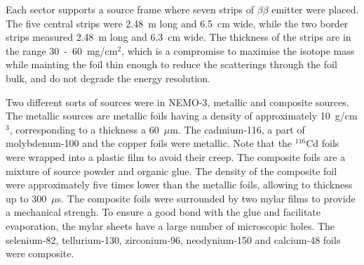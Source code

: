 \documentclass[main.tex]{subfiles}
\begin{document}
\NI Each sector supports a source frame where seven strips of $\beta\beta$ emitter were placed. The five central strips were 2.48~m long and 6.5~cm wide, while the two border strips measured 2.48~m long and 6.3~cm wide. The thickness of the strips are in the range 30~-~60~mg/cm$^\text{2}$, which is a compromise to maximise the isotope mass while mainting the foil thin enough to reduce the scatterings through the foil bulk, and do not degrade the energy resolution.


\bigskip


\NI Two different sorts of sources were in NEMO-3, metallic and composite sources. The metallic sources are metallic foils having a density of approximately 10~g/cm$^\text{3}$, corresponding to a thickness a 60~$\mu$m. The cadmium-116, a part of molybdenum-100 and the copper foils were metallic. Note that the $^{\text{116}}$Cd foils were wrapped into a plastic film to avoid their creep. The composite foils are a mixture of source powder and organic glue. The density of the composite foil were approximately five times lower than the metallic foils, allowing to thickness up to 300~$\mu$s. The composite foils were surrounded by two mylar films to provide a mechanical strengh. To ensure a good bond with the glue and facilitate evaporation, the mylar sheets have a large number of microscopic holes. The selenium-82, tellurium-130, zirconium-96, neodynium-150 and calcium-48 foils were composite.



\end{document}
